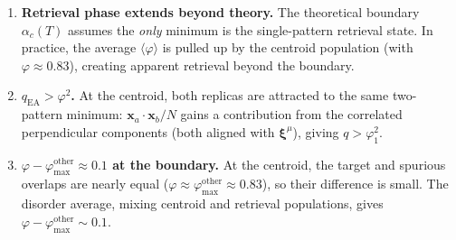 \documentclass[11pt]{article}
\newcommand{\bxi}{\boldsymbol{\xi}}
\newcommand{\bx}{\mathbf{x}}
\newcommand{\avg}[1]{\langle #1 \rangle}
\begin{document}
\begin{enumerate}
\item \textbf{Retrieval phase extends beyond theory.}  The theoretical boundary $\alpha_c(T)$ assumes the \emph{only} minimum is the single-pattern retrieval state.  In practice, the average $\avg{\varphi}$ is pulled up by the centroid population (with $\varphi \approx 0.83$), creating apparent retrieval beyond the boundary.

\item \textbf{$q_{\mathrm{EA}} > \varphi^2$.}  At the centroid, both replicas are attracted to the same two-pattern minimum: $\bx_a \cdot \bx_b / N$ gains a contribution from the correlated perpendicular components (both aligned with $\bxi^\mu$), giving $q > \varphi_1^2$.

\item \textbf{$\varphi - \varphi_{\max}^{\mathrm{other}} \approx 0.1$ at the boundary.}  At the centroid, the target and spurious overlaps are nearly equal ($\varphi \approx \varphi_{\max}^{\mathrm{other}} \approx 0.83$), so their difference is small.  The disorder average, mixing centroid and retrieval populations, gives $\varphi - \varphi_{\max}^{\mathrm{other}} \sim 0.1$.
\end{enumerate}
\end{document}
